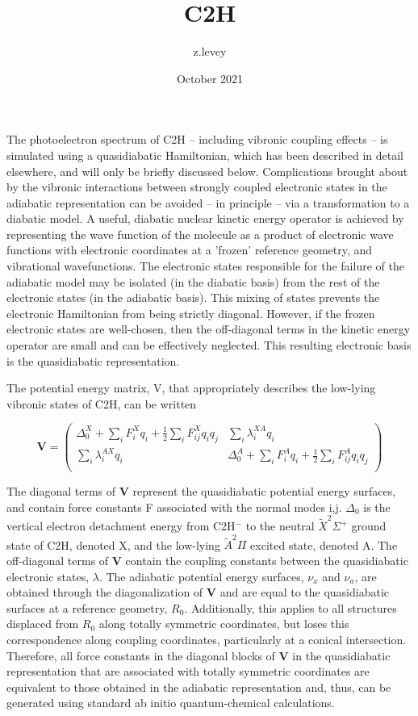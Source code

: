 \documentclass{article}
\title{C2H}
\author{z.levey }
\date{October 2021}
\begin{document}
The photoelectron spectrum of C2H -- including vibronic coupling effects -- is simulated using a quasidiabatic Hamiltonian, which has been described in detail elsewhere, and will only be briefly discussed below.
Complications brought about by the vibronic interactions between strongly coupled electronic states in the adiabatic representation can be avoided -- in principle -- via a transformation to a diabatic model. A useful, diabatic nuclear kinetic energy operator is achieved by representing the wave function of the molecule as a product of electronic wave functions with electronic coordinates at a 'frozen' reference geometry, and vibrational wavefunctions.
The electronic states responsible for the failure of the adiabatic model may be isolated (in the diabatic basis) from the rest of the electronic states (in the adiabatic basis). This mixing of states prevents the electronic Hamiltonian from being strictly diagonal. However, if the frozen electronic states are well-chosen, then the off-diagonal terms in the kinetic energy operator are small and can be effectively neglected. This resulting electronic basis is the quasidiabatic representation.

The potential energy matrix, V, that appropriately describes the low-lying vibronic states of C2H, can be written

\begin{equation*}
\boldsymbol{V} = 
\begin{pmatrix}
    \Delta_0^X + \sum\limits_i F^{X}_{i}q_{i} + \frac{1}{2}\sum\limits_i F^{X}_{ij}q_{i}q_{j}  &
    \sum\limits_i \lambda_{i}^{XA}q_{i} \\
    \sum\limits_i \lambda_{i}^{AX}q_{i} &
    \Delta_0^A + \sum\limits_i F^{A}_{i}q_{i} + \frac{1}{2}\sum\limits_i F^{A}_{ij}q_{i}q_{j} \\  
\end{pmatrix}
\end{equation*}

The diagonal terms of $\boldsymbol{V}$ represent the quasidiabatic potential energy surfaces, and contain force constants F associated with the normal modes i,j. $\Delta_0$ is the vertical electron detachment energy from C2H$^-$ to the neutral $\tilde{X}^2\Sigma^+$ ground state of C2H, denoted X, and the low-lying $\tilde{A}^2\Pi$ excited state, denoted A.  
The off-diagonal terms of $\boldsymbol{V}$ contain the coupling constants between the quasidiabatic electronic states, $\lambda$.
The adiabatic potential energy surfaces, $\nu_x$ and $\nu_a$, are obtained through the diagonalization of $\boldsymbol{V}$ and are equal to the quasidiabatic surfaces at a reference geometry, $R_0$. Additionally, this applies to all structures displaced from $R_0$ along totally symmetric coordinates, but loses this correspondence along coupling coordinates, particularly at a conical intersection. 
Therefore, all force constants in the diagonal blocks of $\boldsymbol{V}$ in the quasidiabatic representation that are associated with totally symmetric coordinates are equivalent to those obtained in the adiabatic representation and, thus, can be generated using standard ab initio quantum-chemical calculations.
\end{document}
